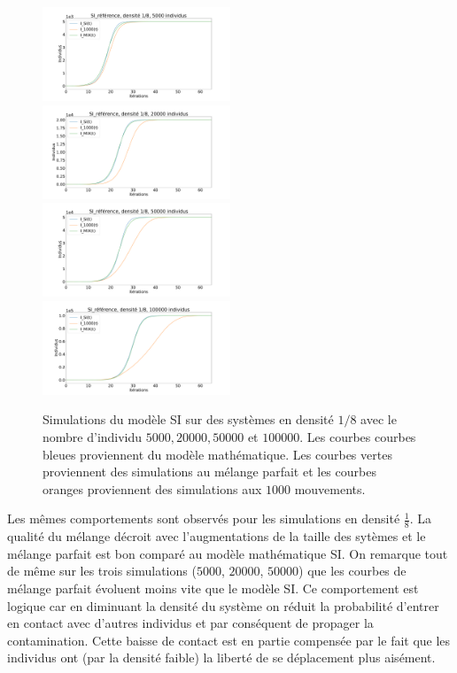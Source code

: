 \begin{figure}
    \centering
    \captionsetup{justification=centering}
    \includegraphics[width=0.5\textwidth]{Images/SI_ref_8_5k.pdf}
    \includegraphics[width=0.5\textwidth]{Images/SI_ref_8_20k.pdf}
    \includegraphics[width=0.5\textwidth]{Images/SI_ref_8_50k.pdf}
    \includegraphics[width=0.5\textwidth]{Images/SI_ref_8_100k.pdf}
    \caption[Simulations de SI, densité 1/8]{Simulations du modèle SI sur des systèmes en densité $1/8$ avec le nombre d'individu $5000,20000,50000$ et $100000$. Les courbes courbes bleues proviennent du modèle mathématique. Les courbes vertes proviennent des simulations au mélange parfait et les courbes oranges proviennent des simulations aux $1000$ mouvements.}
\end{figure}

Les mêmes comportements sont observés pour les simulations en densité $\frac{1}{8}$. La qualité du mélange décroit avec l'augmentations de la taille des sytèmes et le mélange parfait est bon comparé au modèle mathématique SI. On remarque tout de même sur les trois simulations ($5000$, $20000$, $50000$) que les courbes de mélange parfait évoluent moins vite que le modèle SI. Ce comportement est logique car en diminuant la densité du système on réduit la probabilité d'entrer en contact avec d'autres individus et par conséquent de propager la contamination. Cette baisse de contact est en partie compensée par le fait que les individus ont (par la densité faible) la liberté de se déplacement plus aisément.\\

